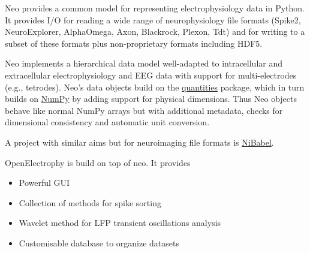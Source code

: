 \begin{multicols}{3}
\vspace{1em}

Neo provides a common model for representing
electrophysiology data in Python. It provides I/O for reading a wide
range of neurophysiology file formats (Spike2,
NeuroExplorer, AlphaOmega, Axon, Blackrock, Plexon, Tdt) and for
writing to a subset of these formats plus non-proprietary formats
including HDF5.


Neo implements a hierarchical data model well-adapted to intracellular
and extracellular electrophysiology and EEG data with support for
multi-electrodes (e.g., tetrodes).  Neo's data objects build on
the \href{http://pypi.python.org/pypi/quantities}{quantities} package,
which in turn builds on \href{http://www.numpy.org}{NumPy} by adding
support for physical dimensions. Thus Neo objects behave like
normal NumPy arrays but with additional metadata, checks for
dimensional consistency and automatic unit conversion.

A project with similar aims but for neuroimaging file formats is
\href{http://www.nipy.org/nibabel}{NiBabel}.




OpenElectrophy is build on top of neo.  It provides

\begin{itemize}[nolistsep,topsep=0em,leftmargin=1pc]
\item Powerful GUI
\item Collection of methods for spike sorting
\item Wavelet method for LFP transient oscillations analysis
\item Customisable database to organize datasets
\end{itemize}


\end{multicols}
